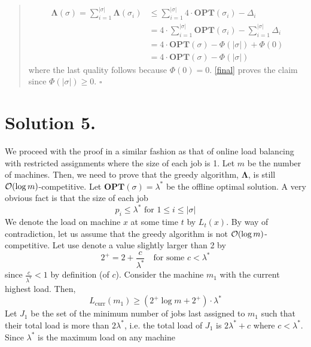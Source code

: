 \documentclass[11pt]{article}
\newcommand{\bigO}{{\cal O}}
\begin{document}
\begin{quote}
\begin{align}
        \mathbf{\Lambda}(\sigma) = \sum_{i=1}^{|\sigma|} \mathbf{\Lambda}(\sigma_{i}) &\leq \sum_{i=1}^{|\sigma|} 4 \cdot \mathbf{OPT}(\sigma_{i}) - \Delta_{i} \\
        &= 4 \cdot \sum_{i=1}^{|\sigma|} \mathbf{OPT}(\sigma_{i}) - \sum_{i=1}^{|\sigma|} \Delta_{i} \\
        &= 4 \cdot \mathbf{OPT}(\sigma) - \Phi(|\sigma|) + \Phi(0) \\
        \label{final}
        &= 4 \cdot \mathbf{OPT}(\sigma) - \Phi(|\sigma|)
    \end{align}
    where the last quality follows because $\Phi(0) = 0$. \eqref{final} proves the claim since $\Phi(|\sigma|) \geq 0$.
    \hfill $\square$
\end{quote}


\section*{Solution 5.}
We proceed with the proof in a similar fashion as that of online load balancing with restricted assignments where the size of each
job is 1. Let $m$ be the number of machines. Then, we need to prove that the greedy algorithm, $\mathbf{\Lambda}$, is still
$\bigO(\log{m})$-competitive. Let $\mathbf{OPT}(\sigma) = \lambda^{*}$ be the offline optimal solution. A very obvious fact is
that the size of each job
\begin{equation}
    p_{i} \leq \lambda^{*} \text{ for } 1 \leq i \leq |\sigma|
\end{equation}
We denote the load on machine $x$ at some time $t$ by $L_{t}(x)$. By way of contradiction, let us assume that the greedy algorithm
is not $\bigO(\log{m})$-competitive. Let use denote a value slightly larger than 2 by
\begin{equation}
    \mathit{2^{+}} = 2 + \frac{c}{\lambda^{*}} \quad \text{for some } c < \lambda^{*}
\end{equation}
since $\frac{c}{\lambda^{*}} < 1$ by definition (of $c$). Consider the machine $m_{1}$ with the current highest load. Then,
\begin{equation}
    \label{load}
    L_{\text{curr}}(m_{1}) \geq (\mathit{2^{+}} \log{m} + \mathit{2^{+}}) \cdot \lambda^{*}
\end{equation}
Let $J_{1}$ be the set of the minimum number of jobs last assigned to $m_{1}$ such that their total load is more than $2\lambda^{*}$,
i.e. the total load of $J_{1}$ is $2 \lambda^{*} + c$ where $c < \lambda^{*}$. Since $\lambda^{*}$ is the maximum load on any machine
\end{document}
